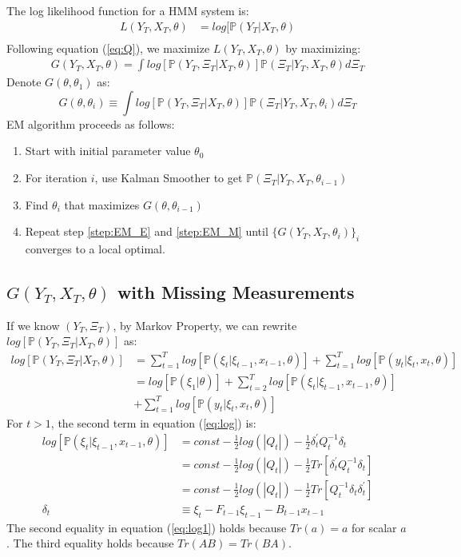 \documentclass[12pt]{article}
\newenvironment{boenumerate}
    {\begin{enumerate}\renewcommand\labelenumi{\textbf\theenumi}}
    {\end{enumerate}}
\numberwithin{equation}{section}
\begin{document}
The log likelihood function for a HMM system is:
\begin{align*}
    L(Y_T,X_T, \theta) &= log[\mathbb{P}(Y_T|X_T,\theta) \\
\end{align*}
Following equation (\ref{eq:Q}), we maximize $L(Y_T,X_T,\theta)$ by maximizing: 
\begin{align*}
    G(Y_T,X_T,\theta) = \int log[\mathbb{P}(Y_T,\Xi_T|X_T,\theta)]\mathbb{P}(\Xi_T|Y_T,X_T,\theta)d\Xi_T 
\end{align*}
Denote $G(\theta,\theta_1)$ as: 
\[
    G(\theta,\theta_i) \equiv \int log[\mathbb{P}(Y_T,\Xi_T|X_T,\theta)]\mathbb{P}(\Xi_T|Y_T,X_T,\theta_i)d\Xi_T
\]
EM algorithm proceeds as follows:
\begin{boenumerate}
    \item Start with initial parameter value $\theta_0$
    \item \label{step:EM_E} For iteration $i$, use Kalman Smoother to get $\mathbb{P}(\Xi_T|Y_T,X_T,\theta_{i-1})$
    \item \label{step:EM_M} Find $\theta_{i}$ that maximizes $G(\theta,\theta_{i-1})$    
    \item Repeat step \ref{step:EM_E} and \ref{step:EM_M} until $\{G(Y_T,X_T,\theta_i)\}_i$ converges to a local optimal.
\end{boenumerate}

\subsection{$G(Y_T,X_T,\theta)$ with Missing Measurements} \label{subsec:G}
If we know $(Y_T,\Xi_T)$, by Markov Property, we can rewrite $log[\mathbb{P}(Y_T,\Xi_T|X_T,\theta)]$ as:
\begin{align}
    log[\mathbb{P}(Y_T,\Xi_T|X_T,\theta)] &= \sum_{t=1}^{T}log[\mathbb{P}(\xi_t|\xi_{t-1},x_{t-1},\theta)] 
    + \sum_{t=1}^{T}log[\mathbb{P}(y_t|\xi_t,x_t,\theta)] \nonumber \\
    &= log[\mathbb{P}(\xi_1|\theta)] + \sum_{t=2}^{T}log[\mathbb{P}(\xi_t|\xi_{t-1},x_{t-1},\theta)] \nonumber \\ 
    &+ \sum_{t=1}^{T}log[\mathbb{P}(y_t|\xi_t,x_t,\theta)]\label{eq:log}
\end{align}
For $t>1$, the second term in equation (\ref{eq:log}) is:
\begin{align}
    log[\mathbb{P}(\xi_t|\xi_{t-1},x_{t-1},\theta)] &= const-\frac{1}{2}log(|Q_t|) 
    -\frac{1}{2}\delta_t^{'}Q_t^{-1}\delta_t \nonumber \\
    &= const-\frac{1}{2}log(|Q_t|) 
    -\frac{1}{2}Tr[\delta_t^{'}Q_t^{-1}\delta_t] \nonumber \\
    &= const-\frac{1}{2}log(|Q_t|) 
    -\frac{1}{2}Tr[Q_t^{-1}\delta_t\delta_t^{'}] \label{eq:log1} \\
    \delta_t &\equiv \xi_t - F_{t-1}\xi_{t-1}-B_{t-1}x_{t-1} \nonumber
\end{align}
The second equality in equation (\ref{eq:log1}) holds because $Tr(a)=a$ for scalar $a$. The third equality holds because $Tr(AB)=Tr(BA)$. 
\end{document}

